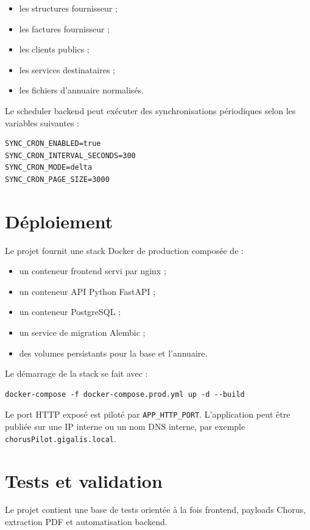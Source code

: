 \documentclass[11pt,a4paper]{article}
\begin{document}
\begin{itemize}
  \item les structures fournisseur ;
  \item les factures fournisseur ;
  \item les clients publics ;
  \item les services destinataires ;
  \item les fichiers d'annuaire normalisés.
\end{itemize}

Le scheduler backend peut exécuter des synchronisations périodiques selon les
variables suivantes :

\begin{lstlisting}
SYNC_CRON_ENABLED=true
SYNC_CRON_INTERVAL_SECONDS=300
SYNC_CRON_MODE=delta
SYNC_CRON_PAGE_SIZE=3000
\end{lstlisting}

\section{Déploiement}

Le projet fournit une stack Docker de production composée de :

\begin{itemize}
  \item un conteneur frontend servi par nginx ;
  \item un conteneur API Python FastAPI ;
  \item un conteneur PostgreSQL ;
  \item un service de migration Alembic ;
  \item des volumes persistants pour la base et l'annuaire.
\end{itemize}

Le démarrage de la stack se fait avec :

\begin{lstlisting}
docker-compose -f docker-compose.prod.yml up -d --build
\end{lstlisting}

Le port HTTP exposé est piloté par \texttt{APP\_HTTP\_PORT}. L'application peut
être publiée sur une IP interne ou un nom DNS interne, par exemple
\texttt{chorusPilot.gigalis.local}.

\section{Tests et validation}

Le projet contient une base de tests orientée à la fois frontend, payloads Chorus,
extraction PDF et automatisation backend.
\end{document}
